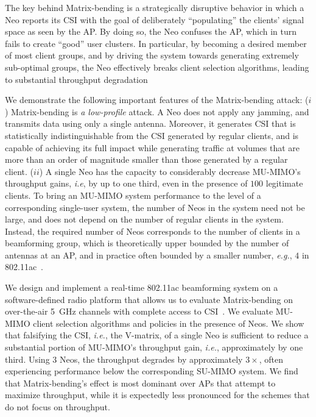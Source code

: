 The key behind Matrix-bending is a strategically disruptive behavior in which a Neo reports its CSI with the goal of deliberately ``populating'' the clients' signal space as seen by the AP. By doing so, the Neo confuses the AP, which in turn fails to create ``good'' user clusters. In particular, by becoming a desired member of most client groups, and by driving the system towards generating extremely sub-optimal groups, the Neo effectively breaks client selection algorithms, leading to substantial throughput degradation


We demonstrate the following important features of the Matrix-bending attack:
($i$) Matrix-bending is \emph{a low-profile} attack. A Neo does not apply any jamming, and transmits data using only a single antenna. Moreover, it generates CSI that is statistically indistinguishable from the CSI generated by regular clients, and is capable of achieving its full impact while generating traffic at volumes that are more than an order of magnitude smaller than those generated by a regular client.
($ii$) A single Neo has the capacity to considerably decrease MU-MIMO's throughput gains, \emph{i.e}, by up to one third, even in the presence of $100$ legitimate clients. To bring an MU-MIMO system performance to the level of a corresponding single-user system, the number of Neos in the system need not be large, and does not depend on the number of regular clients in the system. Instead, the required number of Neos corresponds to the number of clients in a beamforming group, which is theoretically upper bounded by the number of antennas at an AP, and in practice often bounded by a smaller number, \emph{e.g.}, $4$ in 802.11ac~\cite{std11ac}.

We design and implement a real-time 802.11ac beamforming system on a software-defined radio
platform that allows us to evaluate Matrix-bending on over-the-air 5~GHz channels with complete access to CSI~\cite{warpProject}. We evaluate MU-MIMO client selection
algorithms and policies in the presence of Neos. We show that falsifying the CSI, \emph{i.e.}, the V-matrix, of a single Neo is sufficient to reduce a substantial portion of MU-MIMO's throughput gain, \emph{i.e.}, approximately by one third. Using $3$ Neos, the throughput degrades by approximately $3\times$, often experiencing performance below
the corresponding SU-MIMO system. We find that Matrix-bending's effect is most dominant over APs that attempt to maximize throughput,  while it is expectedly less pronounced for the schemes that do not focus on throughput.


